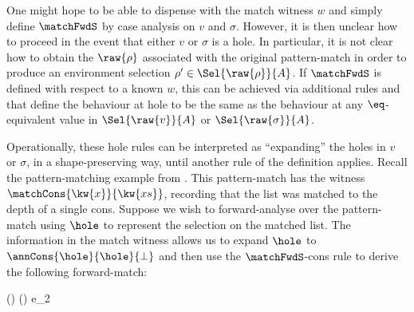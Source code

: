 One might hope to be able to dispense with the match witness $w$ and simply define $\matchFwdS$ by case analysis on $v$ and $\sigma$. However, it is then unclear how to proceed in the event that either $v$ or $\sigma$ is a hole. In particular, it is not clear how to obtain the $\raw{\rho}$ associated with the original pattern-match in order to produce an environment selection $\rho' \in \Sel{\raw{\rho}}{A}$. If $\matchFwdS$ is defined with respect to a known $w$, this can be achieved via additional rules  and  that define the behaviour at hole to be the same as the behaviour at any $\eq$-equivalent value in $\Sel{\raw{v}}{A}$ or $\Sel{\raw{\sigma}}{A}$.

Operationally, these hole rules can be interpreted as ``expanding'' the holes in $v$ or $\sigma$, in a shape-preserving way, until another rule of the definition applies. Recall the pattern-matching example from . This pattern-match has the witness $\matchCons{\kw{x}}{\kw{xs}}$, recording that the list  was matched to the depth of a single cons. Suppose we wish to forward-analyse over the pattern-match using $\hole$ to represent the selection on the matched list. The information in the match witness allows us to expand $\hole$ to $\annCons{\hole}{\hole}{\bot}$ and then use the $\matchFwdS$-cons rule to derive the following forward-match:

\begin{smathpar}
   {
      \matchFwd{\hole}
               {}
               {}
               {() \concat ()}
               {e_2}
               {\bot}
   }
\end{smathpar}

